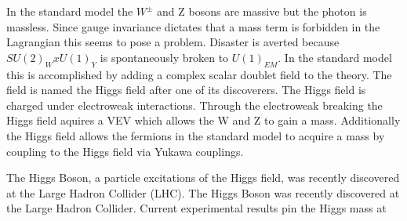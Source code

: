 
In the standard model the $W^{\pm}$ and Z bosons are massive but the photon is massless.
Since gauge invariance dictates that a mass term is forbidden in the Lagrangian this seems to pose a problem.
Disaster is averted because $SU(2)_WxU(1)_Y$ is spontaneously broken to $U(1)_{EM}$.
In the standard model this is accomplished by adding a complex scalar doublet field to the theory.
The field is named the Higgs field after one of its discoverers.
The Higgs field is charged under electroweak interactions.
Through the electroweak breaking the Higgs field aquires a VEV which allows the W and Z to gain a mass.
Additionally the Higgs field allows the fermions in the standard model to acquire a mass by coupling to the Higgs field via Yukawa couplings.


The Higgs Boson, a particle excitations of the Higgs field, was recently discovered at the Large Hadron Collider (LHC).
The Higgs Boson was recently discovered at the Large Hadron Collider.
Current experimental results pin the Higgs mass at


